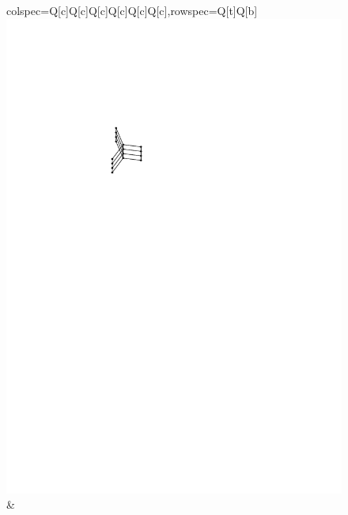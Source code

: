 \documentclass{patmorin}
\theoremstyle{plain}
\theoremstyle{definition}
\begin{document}
\begin{figure}[ht]
\begin{tblr}{colspec={Q[c]Q[c]Q[c]Q[c]Q[c]Q[c]},rowspec={Q[t]Q[b]}}
 \includegraphics[page=2]{figs/S_3xP_4} &

\end{tblr}
\end{figure}
\end{document}
